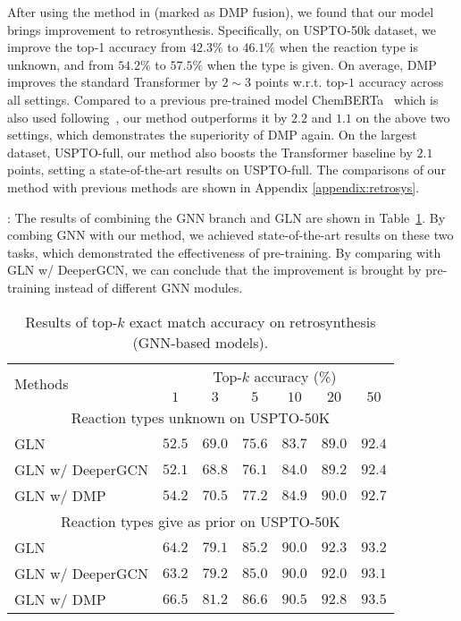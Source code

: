 \documentclass{article}
\newcommand{\ourM}{DMP}
\begin{document}
After using the method in \cite{zhu2020incorporating} (marked as \ourM{} fusion), we found that our model brings improvement to retrosynthesis. Specifically, on USPTO-50k dataset, we improve the top-1 accuracy from $42.3\%$ to $46.1\%$ when the reaction type is unknown, and from $54.2\%$ to $57.5\%$ when the type is given. On average, \ourM{} improves the standard Transformer by $2\sim 3$ points w.r.t. top-$1$ accuracy across all settings. Compared to a previous pre-trained model ChemBERTa~\cite{chithrananda2020chemberta} which is also used following~\cite{zhu2020incorporating}, our method outperforms it by $2.2$ and $1.1$ on the above two settings, which demonstrates the superiority of \ourM{} again. On the largest dataset, USPTO-full, our method also boosts the Transformer baseline by $2.1$ points, setting a state-of-the-art results on USPTO-full. The comparisons of our method with previous methods are shown in Appendix \ref{appendix:retrosys}.

: The results of combining the GNN branch and GLN are shown in Table~\ref{tab:retrosys_gnn}. By combing GNN with our method, we achieved state-of-the-art results on these two tasks, which demonstrated the effectiveness of pre-training. By comparing with GLN w/ DeeperGCN, we can conclude that the improvement is brought by pre-training instead of different GNN modules.

\begin{table}[!htbp]
\centering
\small
\begin{tabular}{lcccccc}
\toprule
\multirow{2}{*}{Methods} & \multicolumn{6}{c}{Top-$k$ accuracy (\%)}  \\
\cmidrule{2-7}
& $1$& $3$ & $5$& $10$&$20$ & $50$\\
\midrule
\multicolumn{7}{c}{Reaction types unknown on USPTO-50K}\\
\midrule
GLN~\citep{GLN} & $52.5$ & $69.0$ & $75.6$ & $83.7$ & $89.0$ & $92.4$ \\
         GLN w/ DeeperGCN & $52.1$ & $68.8$&$76.1$&$84.0$&$89.2$&$92.4$\\
         GLN w/ \ourM{}  &$54.2$&$70.5$&$77.2$&$84.9$&$90.0$&$92.7$\\
\midrule
\multicolumn{7}{c}{Reaction types give as prior on USPTO-50K}\\
\midrule
GLN & $64.2$ & $79.1$ & $85.2$ & $90.0$ & $92.3$ & $93.2$ \\
GLN w/ DeeperGCN & $63.2$ & $79.2$&$85.0$&$90.0$&$92.0$&$93.1$\\
GLN w/ \ourM{}  &$66.5$&$81.2$&$86.6$&$90.5$&$92.8$&$93.5$\\
         \bottomrule
    \end{tabular}
    \caption{Results of top-$k$ exact match accuracy on retrosynthesis (GNN-based models).}
    \label{tab:retrosys_gnn}
\end{table}
\end{document}
